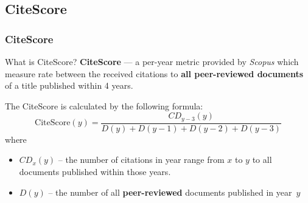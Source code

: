 \documentclass{beamer}
\newcommand{\sco}{\textit{Scopus} }
\begin{document}
\subsection{CiteScore}
\begin{frame}
    \frametitle{CiteScore}
    \begin{block}{What is CiteScore?}
        \textbf{CiteScore}\cite{CiteScore2016} --- a per-year metric provided
        by \sco which measure rate between the received citations
        to \textbf{all peer-reviewed documents} of a title published within 4 years.
    \end{block}

    The CiteScore is calculated by the following formula:
    \[
        \text{CiteScore}(y) = \frac{CD_{y-3}(y)}
        {D(y) + D(y-1) + D(y-2) + D(y-3)}
    \]
    where
    \begin{itemize}
        \item $CD_x(y)$ -- the number of citations in year range from $x$ to $y$
              to all documents published within those years.
        \item $D(y)$ -- the number of all \textbf{peer-reviewed} documents published in year~$y$
    \end{itemize}
\end{frame}
\end{document}
